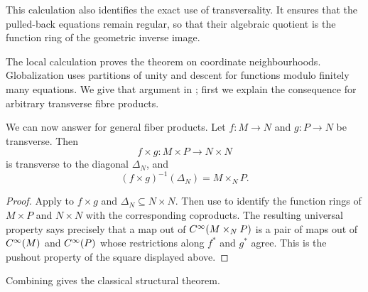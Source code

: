 This calculation also identifies the exact use of transversality. It ensures
that the pulled-back equations remain regular, so that their algebraic
quotient is the function ring of the geometric inverse image.

The local calculation proves the theorem on coordinate neighbourhoods.
Globalization uses partitions of unity and descent for functions modulo
finitely many equations. We give that argument in
; first we explain the consequence
for arbitrary transverse fibre products.

We can now answer  for general fiber
products. Let $f\colon M\to N$ and $g\colon P\to N$ be transverse. Then
\[
  f\times g\colon M\times P\longrightarrow N\times N
\]
is transverse to the diagonal $\Delta_N$, and
\[
  (f\times g)^{-1}(\Delta_N)=M\times_NP.
\]


\begin{proof}
  Apply  to
  $f\times g$ and $\Delta_N\subseteq N\times N$. Then use
   to identify the function rings of
  $M\times P$ and $N\times N$ with the corresponding coproducts. The resulting
  universal property says precisely that a map out of
  $C^\infty(M\times_NP)$ is a pair of maps out of $C^\infty(M)$ and
  $C^\infty(P)$ whose restrictions along $f^*$ and $g^*$ agree. This is the
  pushout property of the square displayed above.
\end{proof}

Combining 
gives the classical structural theorem.

